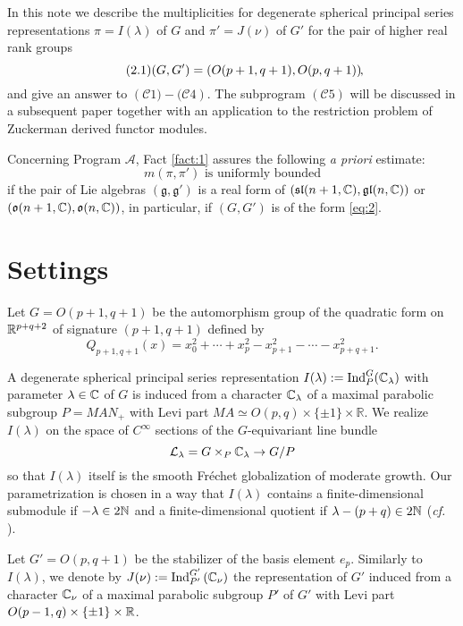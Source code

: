 \documentclass[reqno,12pt]{pja00} %
\newcommand{\Ind}{\mbox{\normalfont Ind}}
\theoremstyle{definition}
\theoremstyle{exampstyle} \newtheorem{examp}[theorem]{Theorem}
\begin{document}
In this note we describe the multiplicities for degenerate spherical principal series representations $\pi=I(\lambda)$ of $G$ and $\pi'=J(\nu)$ of $G'$ for the pair
of higher real rank groups\begin{equation}\tag{2.1}\label{eq:2}
	(G,G')=\left( O(p+1,q+1),O(p,q+1) \right)\kern-0.1cm,
\end{equation}
and give an answer to $\left( \mathcal{C}1)-(\mathcal{C}4 \right)$. The subprogram $\left( \mathcal{C}5 \right)$ will be discussed
in a subsequent paper together with an application to the restriction problem of Zuckerman derived functor modules.

Concerning Program $\mathcal{A}$,  Fact \ref{fact:1} assures the following {\it a priori} estimate:\begin{equation*}
	m(\pi,\pi')\mbox{ is uniformly bounded}
\end{equation*}
if the pair of Lie algebras $(\mathfrak{g},\mathfrak{g}')$ is a real form of $(\mathfrak{sl}(n+1,\mathbb{C}),\mathfrak{gl}(n,\mathbb{C}))$
or $(\mathfrak{o}(n+1,\mathbb{C}),\mathfrak{o}(n,\mathbb{C}))$, in particular, if $(G,G')$ is of the form \eqref{eq:2}.
\section{Settings}
Let $G=O(p+1,q+1)$ be the automorphism group of the quadratic form
on $\mathbb{R}^{p+q+2}$ of signature $(p+1,q+1)$ defined by
\begin{equation*}
	Q_{p+1,q+1}(x)
		=x_0^2+\cdots+x_{p}^2-x_{p+1}^2-\cdots-x_{p+q+1}^2.
\end{equation*}

A degenerate spherical principal series representation $I(\lambda):=\Ind_P^G(\C_{\lambda})$ with parameter $\lambda\in\mathbb{C}$ of $G$ is induced from
a character $\mathbb{C}_\lambda$ of a maximal parabolic subgroup $P=MAN_+$
with Levi part
$M A \simeq O (p, q) \times \{ \pm 1 \} \times \mathbb{R}$.
We realize $I(\lambda)$ on the space of $C^\infty$ sections
of the $G$-equivariant line bundle\[
	\mathcal{L}_\lambda=G\times_{P}\mathbb{C}_\lambda\to G/P
\]
so that $I(\lambda)$ itself is the smooth Fr\'echet globalization of moderate growth.
Our parametrization is chosen in a way that
$I(\lambda)$ contains a finite-dimensional submodule if $-\lambda\in2\mathbb{N}$ and a finite-dimensional quotient if $\lambda-\left( p+q\right)\in2\mathbb{N}$ ({\it cf.} \cite{howe1993homogeneous}).

Let $G'=O(p,q+1)$ be the stabilizer of the basis element $e_p$. Similarly to $I(\lambda)$,
we denote by $J(\nu):=\Ind_{P'}^{G'}\left( \C_\nu \right)$ the representation of $G'$
induced from a character $\mathbb{C}_\nu$ of a
maximal parabolic
subgroup $P'$ of $G'$ with Levi part $O(p-1,q)\times\left\{ \pm1 \right\}\times\mathbb{R}$.
\end{document}
